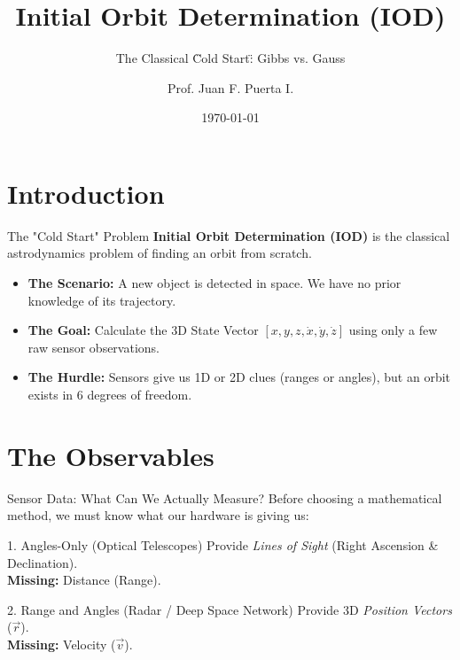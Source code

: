 \documentclass[aspectratio=169]{beamer}
\title[Initial Orbit Determination]{Initial Orbit Determination (IOD)}
\subtitle{The Classical \"Cold Start\": Gibbs vs. Gauss}
\author[Prof. Juan F. Puerta I.]{Prof. Juan F. Puerta I.}
\institute[UdeA]{Aerospace Engineering Program \\ Universidad de Antioquia}
\date{\today}
\begin{document}
\begin{frame}
    \titlepage
\end{frame}

\section{Introduction}

\begin{frame}{The "Cold Start" Problem}
    \textbf{Initial Orbit Determination (IOD)} is the classical astrodynamics problem of finding an orbit from scratch.
    
    \vspace{0.5cm}
    \begin{itemize}
        \item \textbf{The Scenario:} A new object is detected in space. We have no prior knowledge of its trajectory.
        \item \textbf{The Goal:} Calculate the 3D State Vector $[x, y, z, \dot{x}, \dot{y}, \dot{z}]$ using only a few raw sensor observations.
        \item \textbf{The Hurdle:} Sensors give us 1D or 2D clues (ranges or angles), but an orbit exists in 6 degrees of freedom.
    \end{itemize}
\end{frame}

\section{The Observables}

\begin{frame}{Sensor Data: What Can We Actually Measure?}
    Before choosing a mathematical method, we must know what our hardware is giving us:
    
    \vspace{0.3cm}
    \begin{block}{1. Angles-Only (Optical Telescopes)}
        Provide \textit{Lines of Sight} (Right Ascension \& Declination). \\
        \textbf{Missing:} Distance (Range).
    \end{block}
    
    \begin{block}{2. Range and Angles (Radar / Deep Space Network)}
        Provide 3D \textit{Position Vectors} ($\vec{r}$). \\
        \textbf{Missing:} Velocity ($\vec{v}$).
    \end{block}
\end{frame}
\end{document}
